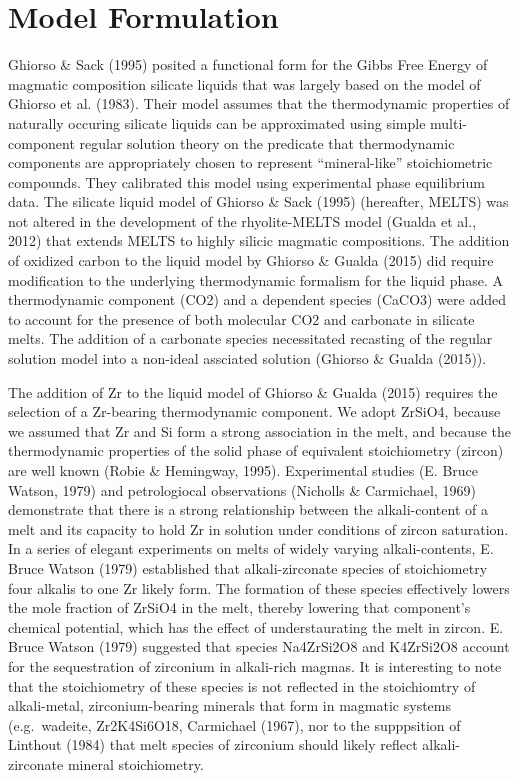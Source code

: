 \documentclass[
]{agujournal2019}
\begin{document}
\section{Model Formulation}\label{model-formulation}

Ghiorso \& Sack (1995) posited a functional form for the Gibbs Free
Energy of magmatic composition silicate liquids that was largely based
on the model of Ghiorso et al. (1983). Their model assumes that the
thermodynamic properties of naturally occuring silicate liquids can be
approximated using simple multi-component regular solution theory on the
predicate that thermodynamic components are appropriately chosen to
represent ``mineral-like'' stoichiometric compounds. They calibrated
this model using experimental phase equilibrium data. The silicate
liquid model of Ghiorso \& Sack (1995) (hereafter, MELTS) was not
altered in the development of the rhyolite-MELTS model (Gualda et al.,
2012) that extends MELTS to highly silicic magmatic compositions. The
addition of oxidized carbon to the liquid model by Ghiorso \& Gualda
(2015) did require modification to the underlying thermodynamic
formalism for the liquid phase. A thermodynamic component (CO2) and a
dependent species (CaCO3) were added to account for the presence of both
molecular CO2 and carbonate in silicate melts. The addition of a
carbonate species necessitated recasting of the regular solution model
into a non-ideal assciated solution (Ghiorso \& Gualda (2015)).

The addition of Zr to the liquid model of Ghiorso \& Gualda (2015)
requires the selection of a Zr-bearing thermodynamic component. We adopt
ZrSiO4, because we assumed that Zr and Si form a strong association in
the melt, and because the thermodynamic properties of the solid phase of
equivalent stoichiometry (zircon) are well known (Robie \& Hemingway,
1995). Experimental studies (E. Bruce Watson, 1979) and petrologiocal
observations (Nicholls \& Carmichael, 1969) demonstrate that there is a
strong relationship between the alkali-content of a melt and its
capacity to hold Zr in solution under conditions of zircon saturation.
In a series of elegant experiments on melts of widely varying
alkali-contents, E. Bruce Watson (1979) established that
alkali-zirconate species of stoichiometry four alkalis to one Zr likely
form. The formation of these species effectively lowers the mole
fraction of ZrSiO4 in the melt, thereby lowering that component's
chemical potential, which has the effect of understaurating the melt in
zircon. E. Bruce Watson (1979) suggested that species Na4ZrSi2O8 and
K4ZrSi2O8 account for the sequestration of zirconium in alkali-rich
magmas. It is interesting to note that the stoichiometry of these
species is not reflected in the stoichiomtry of alkali-metal,
zirconium-bearing minerals that form in magmatic systems (e.g.~wadeite,
Zr2K4Si6O18, Carmichael (1967), nor to the supppsition of Linthout
(1984) that melt species of zirconium should likely reflect
alkali-zirconate mineral stoichiometry.
\end{document}
